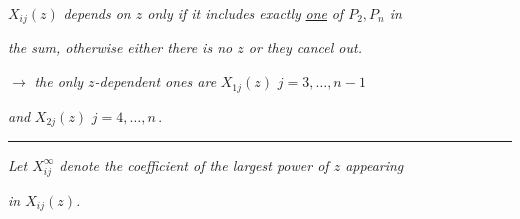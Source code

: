 \documentclass[12pt]{article}
\newcommand{\hw}[1]{\textit{#1}}
\begin{document}
\vspace{0.4cm}

\noindent
$X_{ij}(z)$ \;\hw{depends on $z$ only if it includes exactly} \underline{\hw{one}} \hw{of $P_2, P_n$ in}

\smallskip
\noindent
\hw{the sum, otherwise either there is no $z$ or they cancel out.}

\vspace{0.4cm}

\noindent
$\to$ \;\hw{the only $z$-dependent ones are} \quad $X_{1j}(z)$ \quad $j = 3, \ldots, n\!-\!1$

\smallskip
\noindent
\hspace{1cm}\hw{and} \quad $X_{2j}(z)$ \quad $j = 4, \ldots, n\,.$

\vspace{0.5cm}

\noindent\rule{2cm}{1pt}

\vspace{0.4cm}

\noindent
\hw{Let $X^{\infty}_{ij}$ denote the coefficient of the largest power of $z$ appearing}

\smallskip
\noindent
\hw{in\; $X_{ij}(z)$.}
\end{document}
